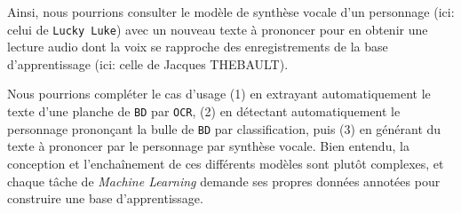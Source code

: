 			Ainsi, nous pourrions consulter le modèle de synthèse vocale d'un personnage (ici: celui de \texttt{Lucky Luke}) avec un nouveau texte à prononcer pour en obtenir une lecture audio dont la voix se rapproche des enregistrements de la base d'apprentissage (ici: celle de Jacques THEBAULT).
			
			\begin{leftBarInformation}
				Nous pourrions compléter le cas d'usage
				(1) en extrayant automatiquement le texte d'une planche de \texttt{BD} par \texttt{OCR},
				(2) en détectant automatiquement le personnage prononçant la bulle de \texttt{BD} par classification,
				puis (3) en générant du texte à prononcer par le personnage par synthèse vocale.
				Bien entendu, la conception et l'enchaînement de ces différents modèles sont plutôt complexes, et chaque tâche de \textit{Machine Learning} demande ses propres données annotées pour construire une base d'apprentissage.
			\end{leftBarInformation}
			
			
		
